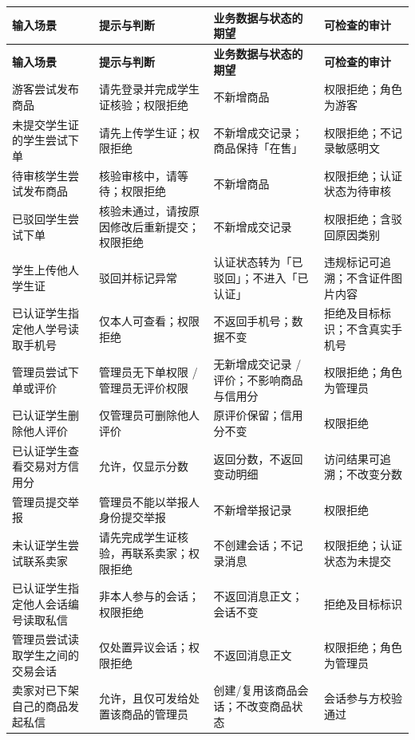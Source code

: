 \documentclass[12pt,a4paper]{ctexart}
\begin{document}
{\scriptsize
\begin{longtable}{|p{3.66cm}|p{4.50cm}|p{4.84cm}|p{3.01cm}|}
\hline
\textbf{输入场景} & \textbf{提示与判断} & \textbf{业务数据与状态的期望} & \textbf{可检查的审计} \\
\hline
\endfirsthead
\hline
\textbf{输入场景} & \textbf{提示与判断} & \textbf{业务数据与状态的期望} & \textbf{可检查的审计} \\
\hline
\endhead
\hline
\endfoot
游客尝试发布商品 & 请先登录并完成学生证核验；权限拒绝 & 不新增商品 & 权限拒绝；角色为游客 \\
\hline
未提交学生证的学生尝试下单 & 请先上传学生证；权限拒绝 & 不新增成交记录；商品保持「在售」 & 权限拒绝；不记录敏感明文 \\
\hline
待审核学生尝试发布商品 & 核验审核中，请等待；权限拒绝 & 不新增商品 & 权限拒绝；认证状态为待审核 \\
\hline
已驳回学生尝试下单 & 核验未通过，请按原因修改后重新提交；权限拒绝 & 不新增成交记录 & 权限拒绝；含驳回原因类别 \\
\hline
学生上传他人学生证 & 驳回并标记异常 & 认证状态转为「已驳回」；不进入「已认证」 & 违规标记可追溯；不含证件图片内容 \\
\hline
已认证学生指定他人学号读取手机号 & 仅本人可查看；权限拒绝 & 不返回手机号；数据不变 & 拒绝及目标标识；不含真实手机号 \\
\hline
管理员尝试下单或评价 & 管理员无下单权限 / 管理员无评价权限 & 无新增成交记录 / 评价；不影响商品与信用分 & 权限拒绝；角色为管理员 \\
\hline
已认证学生删除他人评价 & 仅管理员可删除他人评价 & 原评价保留；信用分不变 & 权限拒绝 \\
\hline
已认证学生查看交易对方信用分 & 允许，仅显示分数 & 返回分数，不返回变动明细 & 访问结果可追溯；不改变分数 \\
\hline
管理员提交举报 & 管理员不能以举报人身份提交举报 & 不新增举报记录 & 权限拒绝 \\
\hline
未认证学生尝试联系卖家 & 请先完成学生证核验，再联系卖家；权限拒绝 & 不创建会话；不记录消息 & 权限拒绝；认证状态为未提交 \\
\hline
已认证学生指定他人会话编号读取私信 & 非本人参与的会话；权限拒绝 & 不返回消息正文；会话不变 & 拒绝及目标标识 \\
\hline
管理员尝试读取学生之间的交易会话 & 仅处置异议会话；权限拒绝 & 不返回消息正文 & 权限拒绝；角色为管理员 \\
\hline
卖家对已下架自己的商品发起私信 & 允许，且仅可发给处置该商品的管理员 & 创建/复用该商品会话；不改变商品状态 & 会话参与方校验通过 \\

\end{longtable}}
\end{document}
